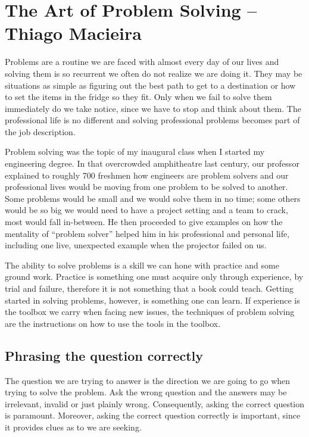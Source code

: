 \chapter{The Art of Problem Solving -- Thiago Macieira}
Problems are a routine we are faced with almost every day of our lives and solving them is so recurrent we often do not realize we are doing it. They may be situations as simple as figuring out the best path to get to a destination or how to set the items in the fridge so they fit. Only when we fail to solve them immediately do we take notice, since we have to stop and think about them. The professional life is no different and solving professional problems becomes part of the job description.

Problem solving was the topic of my inaugural class when I started my engineering degree. In that overcrowded amphitheatre last century, our professor explained to roughly 700 freshmen how engineers are problem solvers and our professional lives would be moving from one problem to be solved to another. Some problems would be small and we would solve them in no time; some others would be so big we would need to have a project setting and a team to crack, most would fall in-between. He then proceeded to give examples on how the mentality of ``problem solver'' helped him in his professional and personal life, including one live, unexpected example when the projector failed on us.

The ability to solve problems is a skill we can hone with practice and some ground work. Practice is something one must acquire only through experience, by trial and failure, therefore it is not something that a book could teach. Getting started in solving problems, however, is something one can learn. If experience is the toolbox we carry when facing new issues, the techniques of problem solving are the instructions on how to use the tools in the toolbox.

\section*{Phrasing the question correctly}

The question we are trying to answer is the direction we are going to go when trying to solve the problem. Ask the wrong question and the answers may be irrelevant, invalid or just plainly wrong. Consequently, asking the correct question is paramount. Moreover, asking the correct question correctly is important, since it provides clues as to  we are seeking.


